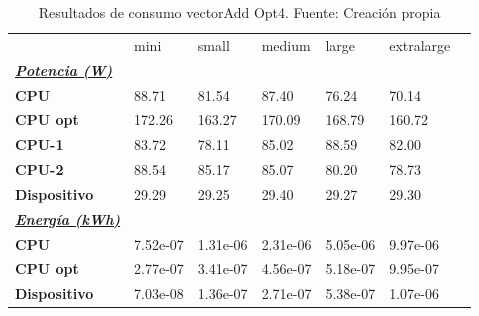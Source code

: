 \begin{table}[H]
    \centering
    \begin{tabular}{lllllll}
    \rowcolor[HTML]{DAE8FC} \ & mini & small & medium & 	large & 	extralarge \\
    \cellcolor[HTML]{DAE8FC} \textbf{\textbf{{\emph{{\underline{{Potencia (W)}}}}}}} &  &  &  & 	 & 	 \\
    \rowcolor[HTML]{EFEFEF} \cellcolor[HTML]{DAE8FC} \textbf{CPU} & 88.71 & 81.54 & 87.40 & 	76.24 & 	70.14 \\
    \cellcolor[HTML]{DAE8FC} \textbf{CPU opt} & 172.26 & 163.27 & 170.09 & 	168.79 & 	160.72 \\
    \rowcolor[HTML]{EFEFEF} \cellcolor[HTML]{DAE8FC} \textbf{\quad CPU-1} & 83.72 & 78.11 & 85.02 & 	88.59 & 	82.00 \\
    \cellcolor[HTML]{DAE8FC} \textbf{\quad CPU-2} & 88.54 & 85.17 & 85.07 & 	80.20 & 	78.73 \\
    \rowcolor[HTML]{EFEFEF} \cellcolor[HTML]{DAE8FC} \textbf{Dispositivo} & 29.29 & 29.25 & 29.40 & 	29.27 & 	29.30 \\
    \cellcolor[HTML]{DAE8FC} \textbf{\textbf{{\emph{{\underline{{Energía (kWh)}}}}}}} &  &  &  & 	 & 	 \\
    \rowcolor[HTML]{EFEFEF} \cellcolor[HTML]{DAE8FC} \textbf{CPU} & 7.52e-07 & 1.31e-06 & 2.31e-06 & 	5.05e-06 & 	9.97e-06 \\
    \cellcolor[HTML]{DAE8FC} \textbf{CPU opt} & 2.77e-07 & 3.41e-07 & 4.56e-07 & 	5.18e-07 & 	9.95e-07 \\
    \rowcolor[HTML]{EFEFEF} \cellcolor[HTML]{DAE8FC} \textbf{Dispositivo} & 7.03e-08 & 1.36e-07 & 2.71e-07 & 	5.38e-07 & 	1.07e-06 \\
    \end{tabular}
    \caption[Resultados de consumo vectorAdd Opt4]{{Resultados de consumo vectorAdd Opt4. Fuente: Creación propia}}
    \label{table_test_vectorAdd_Opt4_hw_powerResults}
\end{table}